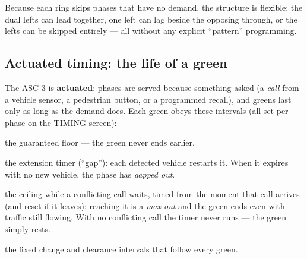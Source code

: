 \documentclass[11pt]{article}
\newcommand{\screen}[1]{\textsc{#1}}
\begin{document}
Because each ring skips phases that have no demand, the structure is flexible: the
dual lefts can lead together, one left can lag beside the opposing through, or the
lefts can be skipped entirely — all without any explicit ``pattern'' programming.

\subsection{Actuated timing: the life of a green}\label{sec:actuated}

The ASC-3 is \textbf{actuated}: phases are served because something asked
(a \emph{call} from a vehicle sensor, a pedestrian button, or a programmed recall),
and greens last only as long as the demand does. Each green obeys these intervals
(all set per phase on the \screen{TIMING} screen):

\begin{description}[nosep,leftmargin=2.6cm,style=nextline]
  \item[Min Green] the guaranteed floor — the green never ends earlier.
  \item[Passage] the extension timer (``gap''): each detected vehicle restarts it.
        When it expires with no new vehicle, the phase has \emph{gapped out}.
  \item[Max Green] the ceiling while a conflicting call waits, timed from the
        moment that call arrives (and reset if it leaves): reaching it is a
        \emph{max-out} and the green ends even with traffic still flowing. With no
        conflicting call the timer never runs — the green simply rests.
  \item[Yellow / Red Clear] the fixed change and clearance intervals that follow
        every green.
\end{description}
\end{document}
